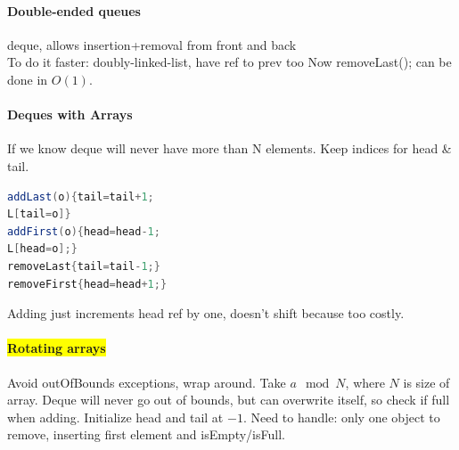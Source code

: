 \paragraph{Double-ended queues} deque, allows insertion+removal from front and back
\\ To do it faster: doubly-linked-list, have ref to prev too
Now removeLast(); can be done in $O(1)$.
\vspace{-7 pt}
\paragraph{Deques with Arrays}
If we know deque will never have more than N elements. Keep indices for head \& tail.
\begin{lstlisting}[language=java]
addLast(o){tail=tail+1;
L[tail=o]}
addFirst(o){head=head-1;
L[head=o];}
removeLast{tail=tail-1;}
removeFirst{head=head+1;}
\end{lstlisting}
Adding just increments head ref by one, doesn't shift because too costly.
\vspace{-7 pt}
\paragraph{\colorbox{Yellow}{Rotating arrays}}
Avoid outOfBounds exceptions, wrap around. Take $a \mod N$, where $N$ is size of array. Deque will never go out of bounds, but can overwrite itself, so check if full when adding. Initialize head and tail at $-1$. Need to handle: only one object to remove, inserting first element and isEmpty/isFull.
\color{Orchid}
